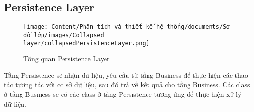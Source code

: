 \subsection{Persistence Layer}

\begin{figure}[H]
    \centering
    \texttt{[image: Content/Phân tích và thiết kế hệ thống/documents/Sơ đồ lớp/images/Collapsed layer/collapsedPersistenceLayer.png]}
    \vspace{0.5cm}
    \caption{Tổng quan Persistence Layer}
    \label{fig:Tổng quan Persistence Layer}
\end{figure}
Tầng Persistence sẽ nhận dữ liệu, yêu cầu từ tầng Business để thực hiện các thao tác tương tác với cơ sở dữ liệu, sau đó trả về kết quả cho tầng Business.
Các class ở tầng Business sẽ có các class ở tầng Persistence tương ứng để thực hiện xử lý dữ liệu.

